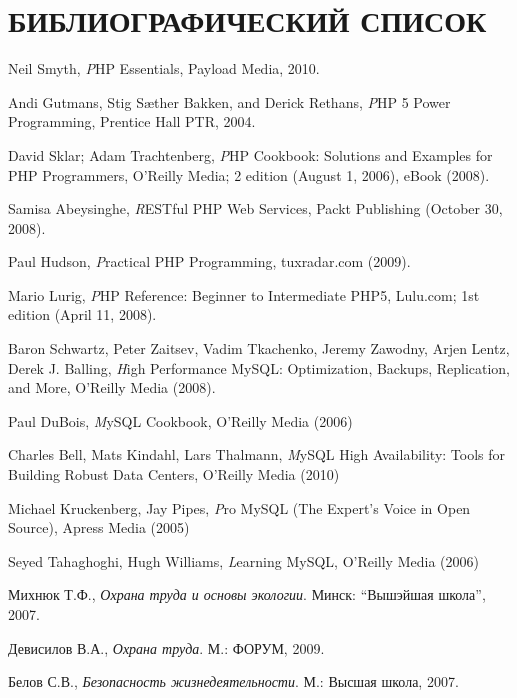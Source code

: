 \section*{БИБЛИОГРАФИЧЕСКИЙ СПИСОК}


\begin{thebibliography}{99}

\bibitem{}
  Neil Smyth,
  \emph PHP Essentials,
  Payload Media,
  2010.

\bibitem{}
  Andi Gutmans, Stig Sæther Bakken, and Derick Rethans,
  \emph PHP 5 Power Programming,
  Prentice Hall PTR,
  2004.

\bibitem{}
  David Sklar; Adam Trachtenberg,
  \emph PHP Cookbook: Solutions and Examples for PHP Programmers,
  O'Reilly Media; 2 edition (August 1, 2006), eBook (2008).
  
\bibitem{}
  Samisa Abeysinghe,
  \emph RESTful PHP Web Services,
  Packt Publishing (October 30, 2008).

\bibitem{}
  Paul Hudson,
  \emph Practical PHP Programming,
  tuxradar.com (2009).

\bibitem{}
  Mario Lurig,
  \emph PHP Reference: Beginner to Intermediate PHP5,
  Lulu.com; 1st edition (April 11, 2008).

\bibitem{}
  Baron Schwartz, Peter Zaitsev, Vadim Tkachenko, Jeremy Zawodny, Arjen Lentz, Derek J. Balling,
  \emph High Performance MySQL: Optimization, Backups, Replication, and More,
  O'Reilly Media (2008).


\bibitem{}
  Paul DuBois,
  \emph MySQL Cookbook,
  O'Reilly Media (2006)

\bibitem{}
  Charles Bell, Mats Kindahl, Lars Thalmann,
  \emph MySQL High Availability: Tools for Building Robust Data Centers,
  O'Reilly Media (2010)

\bibitem{}
  Michael Kruckenberg, Jay Pipes,
  \emph Pro MySQL (The Expert's Voice in Open Source),
  Apress Media (2005)

\bibitem{}
  Seyed Tahaghoghi, Hugh Williams,
  \emph Learning MySQL,
  O'Reilly Media (2006)
 
  Михнюк Т.Ф.,
  \emph{Охрана труда и основы экологии}.
  Минск: ``Вышэйшая школа'',
  2007.

  Девисилов В.А.,
  \emph{Охрана труда}.
  М.: ФОРУМ,
  2009.

  Белов С.В.,
  \emph{Безопасность жизнедеятельности}.
  М.: Высшая школа,
  2007.


\end{thebibliography}
